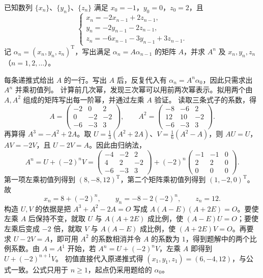 \documentclass[UTF8,zihao=-4,fontset=fandol]{ctexart}
\begin{document}
已知数列 $\{x_n\}$、$\{y_n\}$、$\{z_n\}$ 满足 $x_0=-1$，$y_0=0$，$z_0=2$，且
\[
\begin{cases}
x_n=-2x_{n-1}+2z_{n-1},\\
y_n=-2y_{n-1}-2z_{n-1},\\
z_n=-6x_{n-1}-3y_{n-1}+3z_{n-1}.
\end{cases}
\]
记 $\alpha_n=(x_n,y_n,z_n)^{\mathrm T}$，写出满足 $\alpha_n=A\alpha_{n-1}$ 的矩阵 $A$，并求 $A^n$ 及 $x_n,y_n,z_n$（$n=1,2,\ldots$）。

\Solution
\Known 每条递推式给出 $A$ 的一行。写出 $A$ 后，反复代入有 $\alpha_n=A^n\alpha_0$，因此只需求出 $A^n$ 并乘初值列。
\Method 计算前几次幂，发现三次幂可以用前两次幂表示。拟用两个由 $A,A^2$ 组成的矩阵写出每一阶幂，并通过左乘 $A$ 验证。
\Derive 读取三条式子的系数，得
\[
A=\begin{pmatrix}-2&0&2\\0&-2&-2\\-6&-3&3\end{pmatrix},
\qquad
A^2=\begin{pmatrix}-8&-6&2\\12&10&-2\\-6&-3&3\end{pmatrix}.
\]
再算得 $A^3=-A^2+2A$。取 $U=\frac{1}{3}(A^2+2A)$、$V=\frac{1}{6}(A^2-A)$，则 $AU=U$，$AV=-2V$，且 $U-2V=A$。因此由归纳法，
\[
A^n=U+(-2)^nV
=\begin{pmatrix}-4&-2&2\\4&2&-2\\-6&-3&3\end{pmatrix}
+(-2)^n\begin{pmatrix}-1&-1&0\\2&2&0\\0&0&0\end{pmatrix}.
\]
第一项左乘初值列得到 $(8,-8,12)^{\mathrm T}$，第二个矩阵乘初值列得到 $(1,-2,0)^{\mathrm T}$。故
\[
x_n=8+(-2)^n,\qquad y_n=-8-2(-2)^n,\qquad z_n=12.
\]
构造 $U,V$ 的依据是把 $A^3+A^2-2A=O$ 写成 $A(A-E)(A+2E)=O$。要使左乘 $A$ 后保持不变，就取 $U$ 与 $A(A+2E)$ 成比例，使 $(A-E)U=O$；要使左乘后变成 $-2$ 倍，就取 $V$ 与 $A(A-E)$ 成比例，使 $(A+2E)V=O$。再要求 $U-2V=A$，即可用 $A^2$ 的系数相消并令 $A$ 的系数为 $1$，得到题解中的两个比例系数。由 $A=A^1$ 开始，若 $A^n=U+(-2)^nV$，左乘 $A$ 即得到 $U+(-2)^{n+1}V$。
\Verify 初值直接代入原递推式得 $(x_1,y_1,z_1)=(6,-4,12)$，与公式一致。公式只用于 $n\ge1$，起点仍采用题给的 $\alpha_0$。
\end{document}

